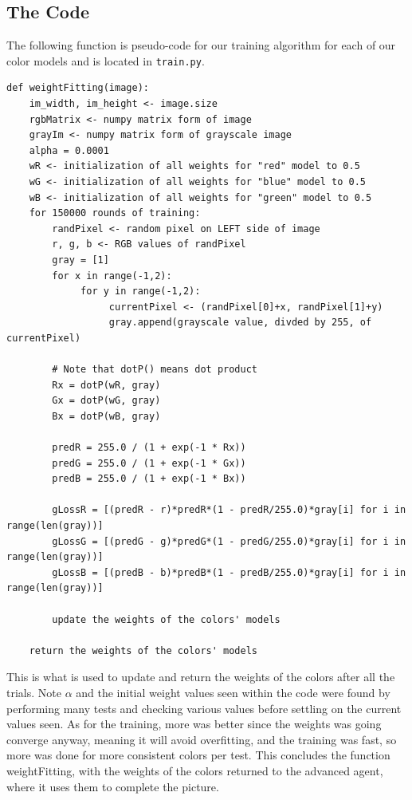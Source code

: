 \documentclass[11pt]{article}
\begin{document}
\subsection{The Code}
The following function is pseudo-code for our training algorithm for each of our color models and is located in \verb|train.py|.
\begin{verbatim}
def weightFitting(image):
    im_width, im_height <- image.size
    rgbMatrix <- numpy matrix form of image
    grayIm <- numpy matrix form of grayscale image
    alpha = 0.0001
    wR <- initialization of all weights for "red" model to 0.5
    wG <- initialization of all weights for "blue" model to 0.5
    wB <- initialization of all weights for "green" model to 0.5
    for 150000 rounds of training:
        randPixel <- random pixel on LEFT side of image
        r, g, b <- RGB values of randPixel
        gray = [1]
        for x in range(-1,2):
             for y in range(-1,2):
                  currentPixel <- (randPixel[0]+x, randPixel[1]+y) 
                  gray.append(grayscale value, divded by 255, of currentPixel)
                  
        # Note that dotP() means dot product
        Rx = dotP(wR, gray)
        Gx = dotP(wG, gray)
        Bx = dotP(wB, gray)

        predR = 255.0 / (1 + exp(-1 * Rx))
        predG = 255.0 / (1 + exp(-1 * Gx))
        predB = 255.0 / (1 + exp(-1 * Bx))

        gLossR = [(predR - r)*predR*(1 - predR/255.0)*gray[i] for i in range(len(gray))]
        gLossG = [(predG - g)*predG*(1 - predG/255.0)*gray[i] for i in range(len(gray))]
        gLossB = [(predB - b)*predB*(1 - predB/255.0)*gray[i] for i in range(len(gray))]

        update the weights of the colors' models
        
    return the weights of the colors' models
\end{verbatim}

This is what is used to update and return the weights of the colors after all the trials. Note $\alpha$ and the initial weight values seen within the code were found by performing many tests and checking various values before settling on the current values seen. As for the training, more was better since the weights was going converge anyway, meaning it will avoid overfitting, and the training was fast, so more was done for more consistent colors per test. This concludes the function weightFitting, with the weights of the colors returned to the advanced agent, where it uses them to complete the picture.
\end{document}
